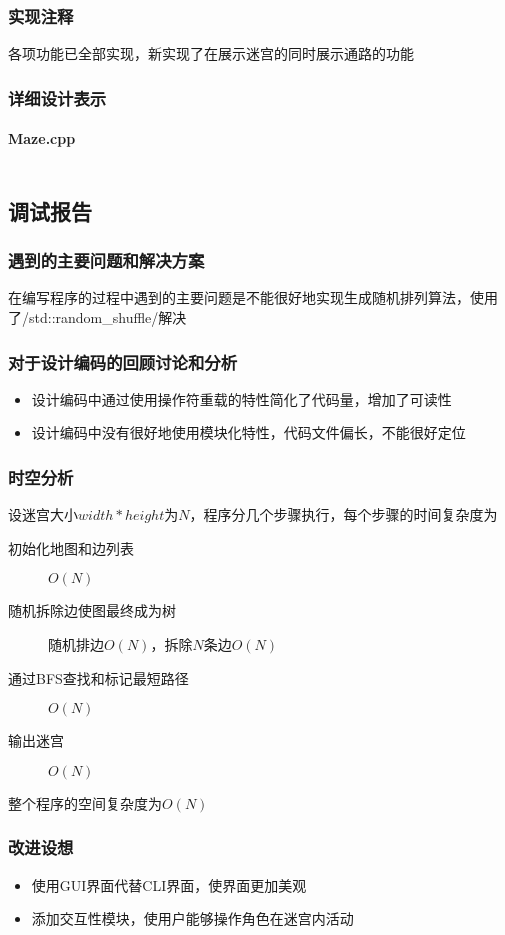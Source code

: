 \documentclass[UTF8]{ctexart}
\begin{document}
      \subsubsection{实现注释}
        各项功能已全部实现，新实现了在展示迷宫的同时展示通路的功能
      \subsubsection{详细设计表示}
        \paragraph{Maze.cpp}
        \inputminted{cpp}{../src/Maze/Maze.cpp}
    \subsection{调试报告}
      \subsubsection{遇到的主要问题和解决方案}
      在编写程序的过程中遇到的主要问题是不能很好地实现生成随机排列算法，使用了\cppinline/std::random_shuffle/解决
      \subsubsection{对于设计编码的回顾讨论和分析}
      \begin{itemize}
        \item 设计编码中通过使用操作符重载的特性简化了代码量，增加了可读性
        \item 设计编码中没有很好地使用模块化特性，代码文件偏长，不能很好定位
      \end{itemize}
      \subsubsection{时空分析}
      设迷宫大小$width * height$为$N$，程序分几个步骤执行，每个步骤的时间复杂度为
      \begin{description}
        \item[初始化地图和边列表]
        $O(N)$
        \item[随机拆除边使图最终成为树]
        随机排边$O(N)$，拆除$N$条边$O(N)$
        \item[通过BFS查找和标记最短路径]
        $O(N)$
        \item[输出迷宫]
        $O(N)$
      \end{description}
      整个程序的空间复杂度为$O(N)$
      \subsubsection{改进设想}
      \begin{itemize}
        \item 使用GUI界面代替CLI界面，使界面更加美观
        \item 添加交互性模块，使用户能够操作角色在迷宫内活动
      \end{itemize}
\end{document}
